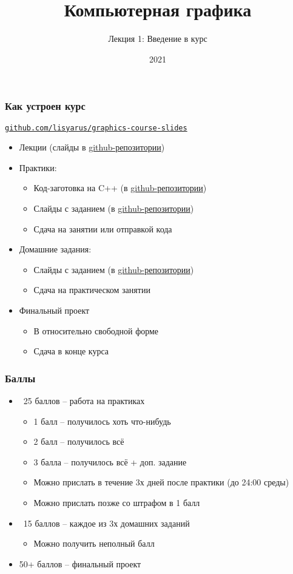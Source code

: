 \documentclass{beamer}
\title{Компьютерная графика}
\subtitle{Лекция 1: Введение в курс}
\date{2021}
\begin{document}
\frame{\titlepage}

\begin{frame}
\frametitle{Как устроен курс}
\href{https://github.com/lisyarus/graphics-course-slides/tree/master/2022/pdf}{\nolinkurl{github.com/lisyarus/graphics-course-slides}}
\pause
\begin{itemize}
\item Лекции (слайды в \href{https://github.com/lisyarus/graphics-course-slides/tree/master/2022/pdf}{github-репозитории})
\pause
\item Практики:
\pause
\begin{itemize}
\item Код-заготовка на C++ (в \href{https://github.com/lisyarus/graphics-course-practice/tree/master/2022}{github-репозитории})
\pause
\item Слайды с заданием (в \href{https://github.com/lisyarus/graphics-course-slides/tree/master/2022/pdf}{github-репозитории})
\pause
\item Сдача на занятии или отправкой кода
\end{itemize}
\pause
\item Домашние задания:
\pause
\begin{itemize}
\item Слайды с заданием (в \href{https://github.com/lisyarus/graphics-course-slides/tree/master/2022/pdf}{github-репозитории})
\pause
\item Сдача на практическом занятии 
\end{itemize}
\pause
\item Финальный проект
\begin{itemize}
\item В относительно свободной форме
\pause
\item Сдача в конце курса
\end{itemize}
\end{itemize}
\end{frame}

\begin{frame}
\frametitle{Баллы}
\begin{itemize}
\pause
\item ~25 баллов -- работа на практиках
\pause
\begin{itemize}
\item 1 балл -- получилось хоть что-нибудь
\item 2 балл -- получилось всё
\item 3 балла -- получилось всё + доп. задание
\pause
\item Можно прислать в течение 3х дней после практики (до 24:00 среды)
\pause
\item Можно прислать позже со штрафом в 1 балл
\end{itemize}
\pause
\item ~15 баллов -- каждое из 3х домашних заданий
\pause
\begin{itemize}
\item Можно получить неполный балл
\end{itemize}
\pause
\item 50+ баллов -- финальный проект
\end{itemize}
\end{frame}
\end{document}
